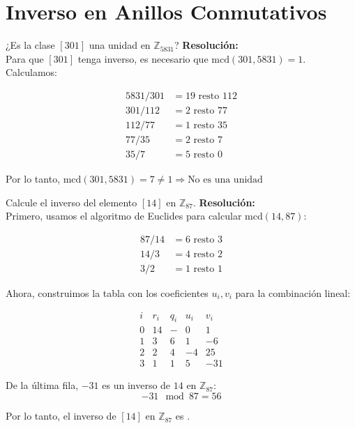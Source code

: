 \documentclass[a4paper,12pt]{article}
\begin{document}
\section{Inverso en Anillos Conmutativos}

\begin{ejercicio}[title=Ejercicio 24]
¿Es la clase $[301]$ una unidad en $\mathbb{Z}_{5831}$?
\tcblower
\textbf{Resolución:} \\
Para que $[301]$ tenga inverso, es necesario que $\mathrm{mcd}(301,5831) = 1$. Calculamos:  

\[
\begin{aligned}
5831 / 301 &= 19 \text{ resto } 112 \\
301 / 112 &= 2 \text{ resto } 77 \\
112 / 77  &= 1 \text{ resto } 35 \\
77 / 35   &= 2 \text{ resto } \boxed{7} \\
35 / 7    &= 5 \text{ resto } 0
\end{aligned}
\]

Por lo tanto, $\mathrm{mcd}(301,5831) = 7 \neq 1 \Rightarrow \boxed{\text{No es una unidad}}$
\end{ejercicio}

\begin{ejercicio}[title=Ejercicio 25]
Calcule el inverso del elemento $[14]$ en $\mathbb{Z}_{87}$.
\tcblower
\textbf{Resolución:} \\
Primero, usamos el algoritmo de Euclides para calcular $\mathrm{mcd}(14,87)$:

\[
\begin{aligned}
87 / 14 &= 6 \text{ resto } 3 \\
14 / 3  &= 4 \text{ resto } 2 \\
3 / 2   &= 1 \text{ resto } \boxed{1}
\end{aligned}
\]

Ahora, construimos la tabla con los coeficientes $u_i, v_i$ para la combinación lineal:

\[
\begin{array}{c|c|c|c|c}
i & r_i & q_i & u_i & v_i \\
\hline
0 & 14 & - & 0 & 1 \\
1 & 3  & 6 & 1 & -6 \\
2 & 2  & 4 & -4 & 25 \\
3 & \boxed{1} & 1 & 5 & -31
\end{array}
\]

De la última fila, $-31$ es un inverso de $14$ en $\mathbb{Z}_{87}$:  
\[
-31 \mod 87 = 56
\]

Por lo tanto, el inverso de $[14]$ en $\mathbb{Z}_{87}$ es \boxed{$[56]$}.
\end{ejercicio}
\end{document}
